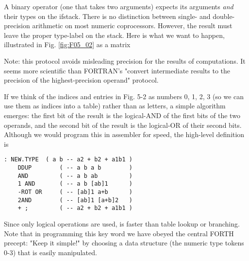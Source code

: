 A binary operator (one that takes two arguments) expects its arguments \textit{and} their types on the ifstack. There is no distinction between single- and double-precision arithmetic on most numeric coprocessors. However, the result must leave the proper type-label on the stack. Here is what we want to happen, illustrated in Fig. \ref{fig:F05_02} as a matrix 

\leftbar[1\linewidth]
Note: this protocol avoids misleading precision for the results of computations. It seems more scientific than FORTRAN's "convert intermediate results to the precision of the highest-precision operand" protocol.
\endleftbar

If we think of the indices and entries in Fig. 5-2 as numbers 0, 1, 2, 3 (so we can use them as indices into a table) rather than as letters, a simple algorithm emerges: the first bit of the result is the logical-AND of the first bits of the two operands, and the second bit of the result is the logical-OR of their second bits. Although we would program this in assembler for speed, the high-level definition is

\begin{lstlisting}
: NEW.TYPE  ( a b -- a2 + b2 + a1b1 )
    DDUP        ( -- a b a b        )
    AND         ( -- a b ab         )
    1 AND       ( -- a b [ab]1      )
    -ROT OR     ( -- [ab]1 a+b      )
    2AND        ( -- [ab]1 [a+b]2   )
    + ;         ( -- a2 + b2 + a1b1 )
\end{lstlisting}

Since only logical operations are used,  is faster than table lookup or branching. Note that in programming this key word we have obeyed the central FORTH precept: "Keep it simple!" by choosing a data structure (the numeric type tokens 0-3) that is easily manipulated.

